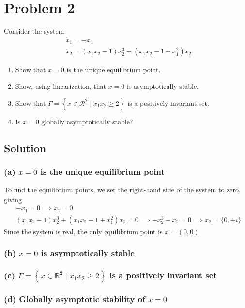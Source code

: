 \section*{Problem 2}

Consider the system
\begin{align*}
     &
    \dot{x}_{1}=-x_{1}
    \\ &
    \dot{x}_{2}=\left(x_{1} x_{2}-1\right) x_{2}^{3}+\left(x_{1} x_{2}-1+x_{1}^{2}\right) x_{2}
\end{align*}
\begin{enumerate}[label= (\alph*)]
    \item Show that \( x=0 \) is the unique equilibrium point.
    \item Show, using linearization, that \( x=0 \) is asymptotically stable.
    \item Show that \( \Gamma=\left \{ x \in \mathcal{R}^{2} \mid x_{1} x_{2} \geq 2\right \} \) is a positively invariant set.
    \item Is \( x=0 \) globally asymptotically stable?
\end{enumerate}

\subsection*{Solution}

\subsubsection*{(a) \( x=0 \) is the unique equilibrium point}

To find the equilibrium points, we set the right-hand side of the system to zero, giving
\begin{align*}
     &
    -x_1 = 0
    \implies
    x_1 = 0
    \\ &
    \left(x_{1} x_{2}-1\right) x_{2}^{3}+\left(x_{1} x_{2}-1+x_{1}^{2}\right) x_{2} = 0
    \implies
    - x_2^3 - x_2 = 0
    \implies
    x_2 = \{ 0, \pm i \}
\end{align*}
Since the system is real, the only equilibrium point is \( x = (0, 0) \).

\subsubsection*{(b) \( x=0 \) is asymptotically stable}

\subsubsection*{(c) \( \Gamma=\left \{ x \in \mathbb{R}^{2} \mid x_{1} x_{2} \geq 2\right \} \) is a positively invariant set}

\subsubsection*{(d) Globally asymptotic stability of \( x=0 \)}
